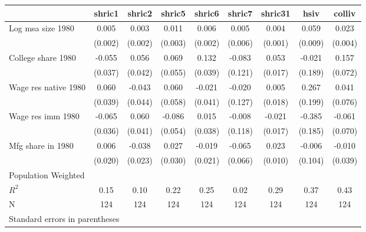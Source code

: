 \begin{tabular}{l*{8}{c}}
\toprule
                &\multicolumn{1}{c}{shric1}&\multicolumn{1}{c}{shric2}&\multicolumn{1}{c}{shric5}&\multicolumn{1}{c}{shric6}&\multicolumn{1}{c}{shric7}&\multicolumn{1}{c}{shric31}&\multicolumn{1}{c}{hsiv}&\multicolumn{1}{c}{colliv}\\
\midrule
Log msa size 1980&    0.005&    0.003&    0.011&    0.006&    0.005&    0.004&    0.059&    0.023\\
                &  (0.002)&  (0.002)&  (0.003)&  (0.002)&  (0.006)&  (0.001)&  (0.009)&  (0.004)\\
College share 1980&   -0.055&    0.056&    0.069&    0.132&   -0.083&    0.053&   -0.021&    0.157\\
                &  (0.037)&  (0.042)&  (0.055)&  (0.039)&  (0.121)&  (0.017)&  (0.189)&  (0.072)\\
Wage res native 1980&    0.060&   -0.043&    0.060&   -0.021&   -0.020&    0.005&    0.267&    0.041\\
                &  (0.039)&  (0.044)&  (0.058)&  (0.041)&  (0.127)&  (0.018)&  (0.199)&  (0.076)\\
Wage res imm 1980&   -0.065&    0.060&   -0.086&    0.015&   -0.008&   -0.021&   -0.385&   -0.061\\
                &  (0.036)&  (0.041)&  (0.054)&  (0.038)&  (0.118)&  (0.017)&  (0.185)&  (0.070)\\
Mfg share in 1980&    0.006&   -0.038&    0.027&   -0.019&   -0.065&    0.023&   -0.006&   -0.010\\
                &  (0.020)&  (0.023)&  (0.030)&  (0.021)&  (0.066)&  (0.010)&  (0.104)&  (0.039)\\
\midrule
Population Weighted&         &         &         &         &         &         &         &         \\
$ R^2$          &     0.15&     0.10&     0.22&     0.25&     0.02&     0.29&     0.37&     0.43\\
N               &      124&      124&      124&      124&      124&      124&      124&      124\\
\bottomrule
\multicolumn{9}{l}{\footnotesize Standard errors in parentheses}\\
\end{tabular}

